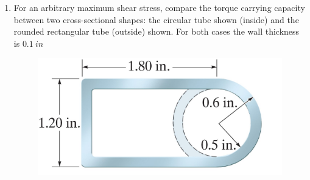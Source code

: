 \documentclass[12pt, oneside]{article}
\let\US\SI
\begin{document}
\begin{enumerate}
	\item %
		For an arbitrary maximum shear stress, compare the torque carrying capacity between two cross-sectional shapes: the circular tube shown (inside) and the rounded rectangular tube (outside) shown.
		For both cases the wall thickness is $\US{0.1}{in}$
		\begin{figure}[H]
			\centering
			\includegraphics[width=0.6\linewidth]{5-109}
		\end{figure}

\end{enumerate}
\end{document}
